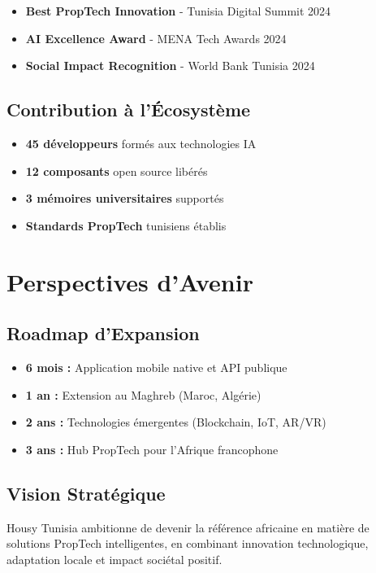 \begin{itemize}
    \item \textbf{Best PropTech Innovation} - Tunisia Digital Summit 2024
    \item \textbf{AI Excellence Award} - MENA Tech Awards 2024
    \item \textbf{Social Impact Recognition} - World Bank Tunisia 2024
\end{itemize}

\subsection*{Contribution à l'Écosystème}

\begin{itemize}
    \item \textbf{45 développeurs} formés aux technologies IA
    \item \textbf{12 composants} open source libérés
    \item \textbf{3 mémoires universitaires} supportés
    \item \textbf{Standards PropTech} tunisiens établis
\end{itemize}

\section*{Perspectives d'Avenir}

\subsection*{Roadmap d'Expansion}

\begin{itemize}
    \item \textbf{6 mois :} Application mobile native et API publique
    \item \textbf{1 an :} Extension au Maghreb (Maroc, Algérie)
    \item \textbf{2 ans :} Technologies émergentes (Blockchain, IoT, AR/VR)
    \item \textbf{3 ans :} Hub PropTech pour l'Afrique francophone
\end{itemize}

\subsection*{Vision Stratégique}

Housy Tunisia ambitionne de devenir la référence africaine en matière de solutions PropTech intelligentes, en combinant innovation technologique, adaptation locale et impact sociétal positif.

